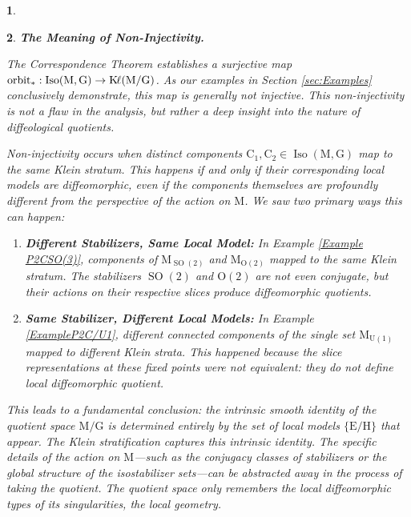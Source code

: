 \documentclass[10pt,reqno,letterpaper,twoside]{amsart}
\theoremstyle{article}
\newtheorem{article}{}
\def\artlabel[#1]{\textbf{#1.}}
\def \C{\mathrm C}
\def \E{\mathrm E}
\def \G{\mathrm G}
\def \H{\mathrm H}
\def \K{\mathrm K}
\def \M{\mathrm M}
\def \O{\mathrm O}
\def \U{\mathrm U}
\DeclareMathOperator{\Iso}{Iso}
\DeclareMathOperator{\Kl}{{\K\hspace{-1pt}\ell}}
\DeclareMathOperator{\SO}{SO}
\newcommand{\orbit}{{\mathrm{orbit}}}
\def \H{\mathrm H} %
\def \O{\mathrm O}
\begin{document}
\begin{article}
  \end{article}
  
  
  \begin{article}
    \artlabel[The Meaning of Non-Injectivity]
    \label{Non-Injectivity_of_the_Map}
    
    The Correspondence Theorem establishes a surjective map $\orbit_* : \Iso(\M,\G) \to \Kl(\M/\G)$.
    As our examples in Section \ref{sec:Examples} conclusively demonstrate,
    this map is generally not injective.
    This non-injectivity is not a flaw in the analysis,
    but rather a deep insight into the nature of diffeological quotients.
    
    Non-injectivity occurs when distinct components $\C_1, \C_2 \in \Iso(\M,\G)$ map to the same Klein stratum.
    This happens if and only if their corresponding local models are diffeomorphic,
    even if the components themselves are profoundly different from the perspective of the action on $\M$.
    We saw two primary ways this can happen:
    
    \begin{enumerate}
      \item \textbf{Different Stabilizers, Same Local Model:} In Example \ref{Example P2CSO(3)},
      components of $\M_{\SO(2)}$ and $\M_{\O(2)}$ mapped to the same Klein stratum.
      The stabilizers $\SO(2)$ and $\O(2)$ are not even conjugate,
      but their actions on their respective slices produce diffeomorphic quotients.
      \item \textbf{Same Stabilizer, Different Local Models:} In Example \ref{ExampleP2C/U1},
      different connected components of the single set $\M_{\U(1)}$ mapped to \emph{different} Klein strata.
      This happened because the slice representations at these fixed points were not equivalent:
      they do not define local diffeomorphic quotient.
    \end{enumerate}
    
    This leads to a fundamental conclusion:
    the intrinsic smooth identity of the quotient space $\M/\G$ is determined entirely by the set of local models $\{\E/\H\}$ that appear.
    The Klein stratification captures this intrinsic identity.
    The specific details of the action on $\M$—such as the conjugacy classes of stabilizers or the global structure of the isostabilizer sets—can be abstracted away in the process of taking the quotient.
    The quotient space only remembers the local diffeomorphic types of its singularities,
    the local geometry.
    
  \end{article}
  
\end{document}
